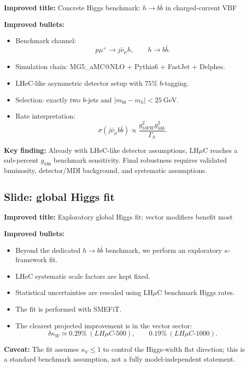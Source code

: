 \documentclass[11pt,a4paper]{article}
\newcommand{\LHmuC}{LH\ensuremath{\mu}C}
\newcommand{\gev}{\ensuremath{~\mathrm{GeV}}}
\begin{document}
\textbf{Improved title:} Concrete Higgs benchmark: \(h\to b\bar b\) in charged-current VBF

\textbf{Improved bullets:}
\begin{itemize}[leftmargin=*]
  \item Benchmark channel:
  \[
    p\mu^+\to j\bar\nu_\mu h,\qquad h\to b\bar b.
  \]
  \item Simulation chain: MG5\_aMC@NLO + Pythia6 + FastJet + Delphes.
  \item LHeC-like asymmetric detector setup with \(75\%\) \(b\)-tagging.
  \item Selection: exactly two \(b\)-jets and \(|m_{bb}-m_h|<25\gev\).
  \item Rate interpretation:
  \[
    \sigma(j\bar\nu_\mu b\bar b)\propto
    \frac{g_{hWW}^2g_{hbb}^2}{\Gamma_h}.
  \]
\end{itemize}

\textbf{Key finding:}
Already with LHeC-like detector assumptions, \LHmuC{} reaches a sub-percent \(g_{hbb}\)
benchmark sensitivity.  Final robustness requires validated luminosity, detector/MDI
background, and systematic assumptions.

\subsection{Slide: global Higgs fit}

\textbf{Improved title:} Exploratory global Higgs fit: vector modifiers benefit most

\textbf{Improved bullets:}
\begin{itemize}[leftmargin=*]
  \item Beyond the dedicated \(h\to b\bar b\) benchmark, we perform an exploratory
        \(\kappa\)-framework fit.
  \item LHeC systematic scale factors are kept fixed.
  \item Statistical uncertainties are rescaled using \LHmuC{} benchmark Higgs rates.
  \item The fit is performed with SMEFiT.
  \item The clearest projected improvement is in the vector sector:
  \[
    \delta\kappa_W\simeq0.29\%~(\LHmuC\text{-}500),
    \qquad
    0.19\%~(\LHmuC\text{-}1000).
  \]
\end{itemize}

\textbf{Caveat:}
The fit assumes \(\kappa_V\le1\) to control the Higgs-width flat direction; this is a standard
benchmark assumption, not a fully model-independent statement.
\end{document}
